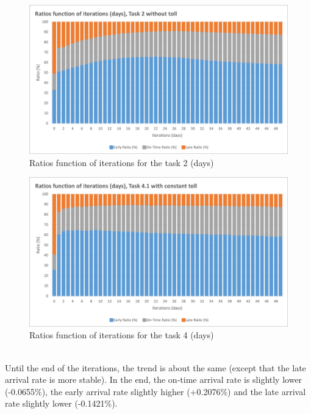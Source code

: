 \documentclass[a4paper, 12pt,oneside]{article}
\begin{document}
\begin{minipage}[c]{0.5\textwidth}
\begin{figure}[H]
    \centering
    \includegraphics[width=1\textwidth]{Images/Step4/Ratios_function_iterations_comparaison_task_2.png}
    \caption{Ratios function of iterations for the task 2 (days)}
    \label{fig:Ratios function of iterations for the task 2 (days)}
\end{figure}
\end{minipage}
\begin{minipage}[c]{0.5\textwidth}
\begin{figure}[H]
    \centering
    \includegraphics[width=1\textwidth]{Images/Step4/Ratios_function_iterations_task_4.1.png}
    \caption{Ratios function of iterations for the task 4 (days)}
    \label{fig:Ratios function of iterations for the task 4 (days)}
\end{figure}
\end{minipage}
\\

Until the end of the iterations, the trend is about the same (except that the late arrival rate is more stable). In the end, the on-time arrival rate is slightly lower (-0.0655\%), the early arrival rate slightly higher (+0.2076\%) and the late arrival rate slightly lower (-0.1421\%).
\end{document}
